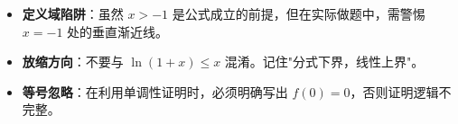 \begin{trapbox}
\begin{itemize}
    \item \textbf{定义域陷阱}：虽然 $x > -1$ 是公式成立的前提，但在实际做题中，需警惕 $x = -1$ 处的垂直渐近线。
    \item \textbf{放缩方向}：不要与 $\ln(1+x) \leqslant x$ 混淆。记住"分式下界，线性上界"。
    \item \textbf{等号忽略}：在利用单调性证明时，必须明确写出 $f(0)=0$，否则证明逻辑不完整。
\end{itemize}
\end{trapbox}